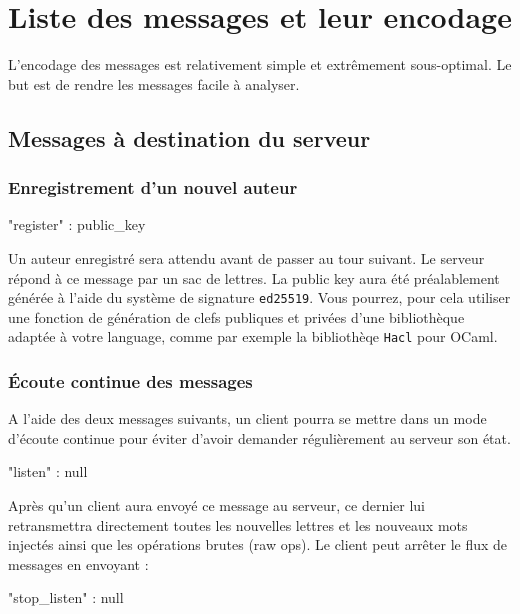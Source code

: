 \documentclass{article}
\begin{document}
\section{Liste des messages et leur encodage}
\label{sec:liste-des-messages}

L'encodage des messages est relativement simple et extrêmement
sous-optimal. Le but est de rendre les messages facile à analyser.

\subsection{Messages à destination du serveur}
\label{sec:mess-vers-serv}

\subsubsection{Enregistrement d'un nouvel auteur}
\label{sec:register}

\begin{jsonMessage}
  { "register" : public_key }
\end{jsonMessage}
Un auteur enregistré sera attendu avant de passer au tour suivant. Le
serveur répond à ce message par un sac de lettres. La public key aura
été préalablement générée à l'aide du système de signature
\texttt{ed25519}. Vous pourrez, pour cela utiliser une fonction de
génération de clefs publiques et privées d'une bibliothèque adaptée à
votre language, comme par exemple la bibliothèqe \texttt{Hacl} pour
OCaml.

\subsubsection{Écoute continue des messages}

A l'aide des deux messages suivants, un client pourra se mettre dans
un mode d'écoute continue pour éviter d'avoir demander régulièrement
au serveur son état.

\label{sec:ecoute-continue}
\begin{jsonMessage}
  { "listen" : null }
\end{jsonMessage}
Après qu'un client aura envoyé ce message au serveur, ce dernier lui
retransmettra directement toutes les nouvelles lettres et les nouveaux
mots injectés ainsi que les opérations brutes (raw ops).  Le client
peut arrêter le flux de messages en envoyant :
\begin{jsonMessage}
  { "stop_listen" : null }
\end{jsonMessage}
\end{document}
